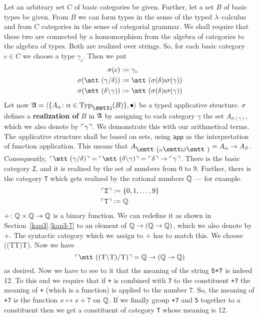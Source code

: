 Let an arbitrary set $C$ of basic categories be given. Further,
let a set $B$ of basic types be given. From $B$ we can form types 
in the sense of the typed $\lambda$--calculus and from $C$ categories 
in the sense of categorial grammar. We shall require that these 
two are connected by a homomorphism from the algebra of 
categories to the algebra of types. Both are realized over
strings. So, for each basic category $c \in C$ we choose a type 
$\gamma_c$. Then we put
\begin{align}
\notag
\sigma(c) & := \gamma_c \\
\sigma(\mbox{\mtt ($\gamma${\tf}$\delta$)}) & 
	:= \mbox{\mtt ($\sigma(\delta)$\symbol{25}$\sigma(\gamma)$)} \\\notag
\sigma(\mbox{\mtt ($\delta${\tb}$\gamma$)}) & 
	:= \mbox{\mtt ($\sigma(\delta)$\symbol{25}$\sigma(\gamma)$)}
\end{align}
Let now $\GA = \auf \{A_{\alpha} \colon \alpha \in 
\Typ_{\mbox{\smtt\symbol{25}}}(B)\}, \bullet\zu$ be a typed 
applicative structure. $\sigma$ defines a \textbf{realization of} 
$B$ in $\mathfrak{A}$ by assigning to each category $\gamma$ the set 
$A_{\sigma(\gamma)}$, which we also denote by $\real{\gamma}$. 
\index{$\real{\gamma}$}%
We demonstrate this with our arithmetical terms. The applicative 
structure shall be based on sets, using $\mathsf{app}$ as the interpretation 
of function application. This means that $A_{\mbox{\smtt (}\alpha
\mbox{\smtt\symbol{25}}\beta\mbox{\smtt )}} = A_{\alpha} \pf A_{\beta}$. 
Consequently, $\real{\mbox{\mtt ($\gamma${\tf}$\delta$)}}  
= \real{\mbox{\mtt ($\delta$\tb$\gamma$)}} = \real{\delta} \pf 
\real{\gamma}$. There is the basic category {\tt Z}, and it is 
realized by the set of numbers from $0$ to $9$. Further, there 
is the category {\tt T} which gets realized by the rational 
numbers $\mathbb{Q}$ --- for example.
\begin{align}
\ulcorner\mbox{\tt Z}\urcorner & := \{0, 1, \dotsc, 9\} \\\notag
\ulcorner\mbox{\tt T}\urcorner & := \mathbb{Q} 
\end{align}
$+ \colon \mathbb{Q} \times \mathbb{Q} \rightarrow \mathbb{Q}$ is a binary function. We  can
redefine it as shown in Section~\ref{kap3}.\ref{kap3-7} to an element of
$\mathbb{Q} \rightarrow (\mathbb{Q} \rightarrow \mathbb{Q})$, which we also denote by $+$. The syntactic 
category which we assign to $+$ has to match this. We choose
{\mtt ((T{\tb}T){\tf}T)}.
Now we have
\begin{equation}
\real{\mbox{\mtt ((T{\tb}T)/T)}}
= \BQ \pf (\BQ \pf \BQ) 
\end{equation}
as desired. Now we have to see to it that the meaning of the
string $\mbox{\tt 5+7}$ is indeed 12. To this end we require
that if {\tt +}  is combined with {\tt 7} to the constituent
{\tt +7} the meaning of {\tt +} (which is a function) is applied
to the number $7$. So, the meaning of {\tt +7} is the function
$x \mapsto x + 7$ on $\mathbb{Q}$. If we finally group {\tt +7} and
{\tt 5} together to a constituent then we get a constituent
of category {\tt T} whose meaning is 12.


